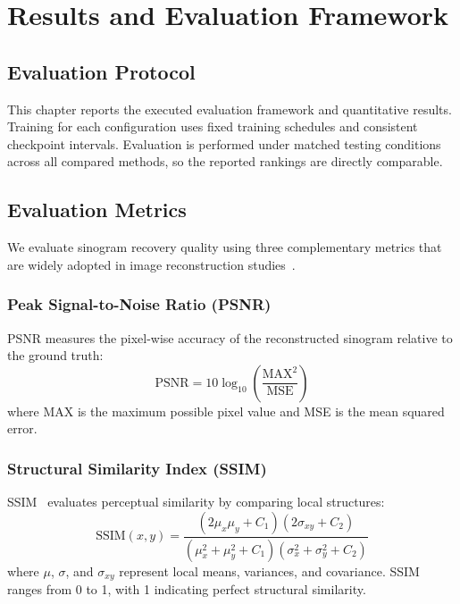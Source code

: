 \chapter{Results and Evaluation Framework}
\label{ch:results}

\section{Evaluation Protocol}

This chapter reports the executed evaluation framework and quantitative results. Training for each configuration uses fixed training schedules and consistent checkpoint intervals. Evaluation is performed under matched testing conditions across all compared methods, so the reported rankings are directly comparable.

\section{Evaluation Metrics}

We evaluate sinogram recovery quality using three complementary metrics that are widely adopted in image reconstruction studies~\cite{wang2004image}.

\subsection{Peak Signal-to-Noise Ratio (PSNR)}

PSNR measures the pixel-wise accuracy of the reconstructed sinogram relative to the ground truth:
\begin{equation}
\text{PSNR} = 10 \log_{10}\left(\frac{\text{MAX}^2}{\text{MSE}}\right)
\end{equation}
where MAX is the maximum possible pixel value and MSE is the mean squared error.

\subsection{Structural Similarity Index (SSIM)}

SSIM~\cite{wang2004image} evaluates perceptual similarity by comparing local structures:
\begin{equation}
\text{SSIM}(x, y) = \frac{(2\mu_x\mu_y + C_1)(2\sigma_{xy} + C_2)}{(\mu_x^2 + \mu_y^2 + C_1)(\sigma_x^2 + \sigma_y^2 + C_2)}
\end{equation}
where $\mu$, $\sigma$, and $\sigma_{xy}$ represent local means, variances, and covariance. SSIM ranges from 0 to 1, with 1 indicating perfect structural similarity.

